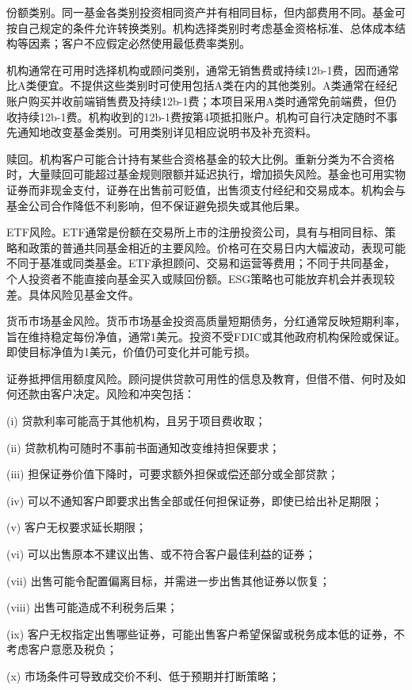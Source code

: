\documentclass[UTF8,fontset=none,11pt,a4paper]{ctexart}
\begin{document}
份额类别。同一基金各类别投资相同资产并有相同目标，但内部费用不同。基金可按自己规定的条件允许转换类别。机构选择类别时考虑基金资格标准、总体成本结构等因素；客户不应假定必然使用最低费率类别。


机构通常在可用时选择机构或顾问类别，通常无销售费或持续12b-1费，因而通常比A类便宜。不提供这些类别时可使用包括A类在内的其他类别。A类通常在经纪账户购买并收前端销售费及持续12b-1费；本项目采用A类时通常免前端费，但仍收持续12b-1费。机构收到的12b-1费按第4项抵扣账户。机构可自行决定随时不事先通知地改变基金类别。可用类别详见相应说明书及补充资料。


赎回。机构客户可能合计持有某些合资格基金的较大比例。重新分类为不合资格时，大量赎回可能超过基金规则限额并延迟执行，增加损失风险。基金也可用实物证券而非现金支付，证券在出售前可贬值，出售须支付经纪和交易成本。机构会与基金公司合作降低不利影响，但不保证避免损失或其他后果。


ETF风险。ETF通常是份额在交易所上市的注册投资公司，具有与相同目标、策略和政策的普通共同基金相近的主要风险。价格可在交易日内大幅波动，表现可能不同于基准或同类基金。ETF承担顾问、交易和运营等费用；不同于共同基金，个人投资者不能直接向基金买入或赎回份额。ESG策略也可能放弃机会并表现较差。具体风险见基金文件。


货币市场基金风险。货币市场基金投资高质量短期债务，分红通常反映短期利率，旨在维持稳定每份净值，通常1美元。投资不受FDIC或其他政府机构保险或保证。即使目标净值为1美元，价值仍可变化并可能亏损。


证券抵押信用额度风险。顾问提供贷款可用性的信息及教育，但借不借、何时及如何还款由客户决定。风险和冲突包括：


(i) 贷款利率可能高于其他机构，且另于项目费收取；


(ii) 贷款机构可随时不事前书面通知改变维持担保要求；


(iii) 担保证券价值下降时，可要求额外担保或偿还部分或全部贷款；


(iv) 可以不通知客户即要求出售全部或任何担保证券，即使已给出补足期限；


(v) 客户无权要求延长期限；


(vi) 可以出售原本不建议出售、或不符合客户最佳利益的证券；


(vii) 出售可能令配置偏离目标，并需进一步出售其他证券以恢复；


(viii) 出售可能造成不利税务后果；


(ix) 客户无权指定出售哪些证券，可能出售客户希望保留或税务成本低的证券，不考虑客户意愿及税负；


(x) 市场条件可导致成交价不利、低于预期并打断策略；
\end{document}

